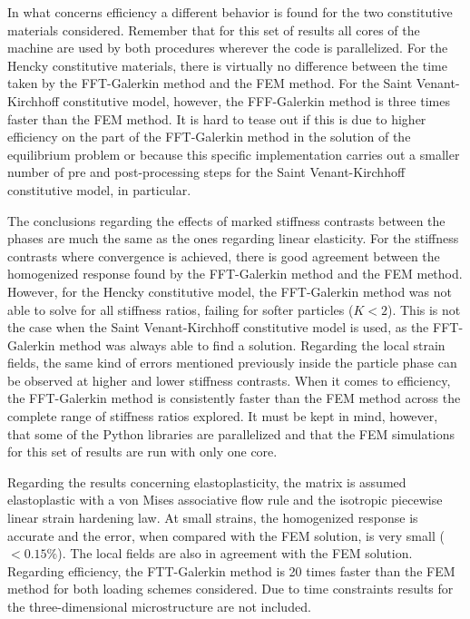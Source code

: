 In what concerns efficiency a different behavior is found for the two constitutive materials considered.
Remember that for this set of results all cores of the machine are used by both procedures wherever the code is parallelized.
For the Hencky constitutive materials, there is virtually no difference between the time taken by the FFT-Galerkin method and the FEM method.
For the Saint Venant-Kirchhoff constitutive model, however, the FFF-Galerkin method is three times faster than the FEM method.
It is hard to tease out if this is due to higher efficiency on the part of the FFT-Galerkin method in the solution of the equilibrium problem or because this specific implementation carries out a smaller number of pre and post-processing steps for the Saint Venant-Kirchhoff constitutive model, in particular.

The conclusions regarding the effects of marked stiffness contrasts between the phases are much the same as the ones regarding linear elasticity.
For the stiffness contrasts where convergence is achieved, there is good agreement between the homogenized response found by the FFT-Galerkin method and the FEM method.
However,  for the Hencky constitutive model, the FFT-Galerkin method was not able to solve for all stiffness ratios, failing for softer particles (\(K<2\)).
This is not the case when the Saint Venant-Kirchhoff constitutive model is used, as the FFT-Galerkin method was always able to find a solution.
Regarding the local strain fields, the same kind of errors mentioned previously inside the particle phase can be observed at higher and lower stiffness contrasts.
When it comes to efficiency, the FFT-Galerkin method is consistently faster than the FEM method across the complete range of stiffness ratios explored.
It must be kept in mind, however, that some of the Python libraries are parallelized and that the FEM simulations for this set of results are run with only one core.

Regarding the results concerning elastoplasticity, the matrix is assumed elastoplastic with a von Mises associative flow rule and the isotropic piecewise linear strain hardening law.
At small strains, the homogenized response is accurate and the error, when compared with the FEM solution, is very small (\(<0.15\%\)).
The local fields are also in agreement with the FEM solution.
Regarding efficiency, the FTT-Galerkin method is 20 times faster than the FEM method for both loading schemes considered.
Due to time constraints results for the three-dimensional microstructure are not included.

